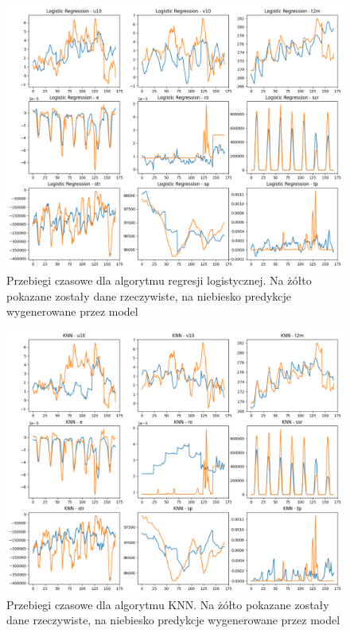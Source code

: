 \begin{figure}[H]
    \centering
    \includegraphics[width=\textwidth]{images/regression_week.png}
    \caption[Przebiegi czasowe dla regresji logistycznej]{Przebiegi czasowe dla algorytmu regresji logistycznej. Na żółto pokazane zostały dane 
    rzeczywiste, na niebiesko predykcje wygenerowane przez model}
    \label{regression-week}
\end{figure}

\begin{figure}[H]
    \centering
    \includegraphics[width=\textwidth]{images/knn_week.png}
    \caption[Przebiegi czasowe dla KNN]{Przebiegi czasowe dla algorytmu KNN. Na żółto pokazane zostały dane 
    rzeczywiste, na niebiesko predykcje wygenerowane przez model}
    \label{knn-week}
\end{figure}

